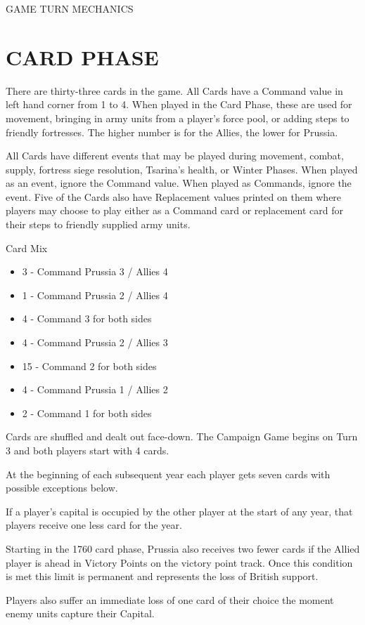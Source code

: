 \bigskip
{\LARGE GAME TURN MECHANICS}

\section{CARD PHASE}
There are thirty-three cards in the game. All Cards have a Command value in left hand corner from 1 to 4. When played in the Card Phase, these are used for movement, bringing in army units from a player’s force pool, or adding steps to friendly fortresses. The higher number is for the Allies, the lower for Prussia.

All Cards have different events that may be played during movement, combat, supply, fortress siege resolution, Tsarina’s health, or Winter Phases. When played as an event, ignore the Command value. When played as Commands, ignore the event. Five of the Cards also have Replacement values printed on them where players may choose to play either as a Command card or replacement card for their steps to friendly supplied army units.

Card Mix
\begin{itemize}
  \setlength\itemsep{-0.5em}
  \item 3 - Command Prussia 3 / Allies 4
  \item 1 - Command Prussia 2 / Allies 4
  \item 4 - Command 3 for both sides
  \item 4 - Command Prussia 2 / Allies 3
  \item 15 - Command 2 for both sides
  \item 4 - Command Prussia 1 / Allies 2
  \item 2 - Command 1 for both sides
\end{itemize}

Cards are shuffled and dealt out face-down. The Campaign Game begins on Turn 3 and both players start with 4 cards.

At the beginning of each subsequent year each player gets seven cards with possible exceptions below.

If a player’s capital is occupied by the other player at the start of any year, that players receive one less card for the year.

Starting in the 1760 card phase, Prussia also receives two fewer cards if the Allied player is ahead in Victory Points on the victory point track. Once this condition is met this limit is permanent and represents the loss of British support.

Players also suffer an immediate loss of one card of their choice the moment enemy units capture their Capital.

